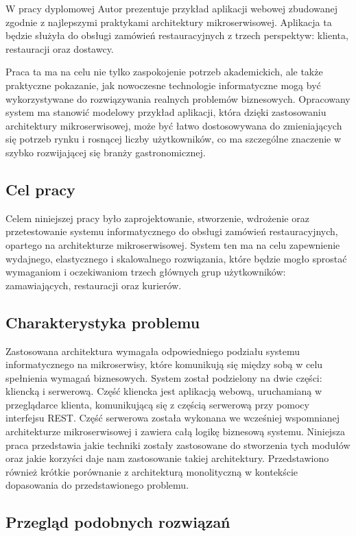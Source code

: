 W pracy dyplomowej Autor prezentuje przykład aplikacji webowej zbudowanej zgodnie z najlepszymi praktykami architektury mikroserwisowej. Aplikacja ta będzie służyła do obsługi zamówień restauracyjnych z trzech perspektyw: klienta, restauracji oraz dostawcy.

Praca ta ma na celu nie tylko zaspokojenie potrzeb akademickich, ale także praktyczne pokazanie, jak nowoczesne technologie informatyczne mogą być wykorzystywane do rozwiązywania realnych problemów biznesowych. Opracowany system ma stanowić modelowy przykład aplikacji, która dzięki zastosowaniu architektury mikroserwisowej, może być łatwo dostosowywana do zmieniających się potrzeb rynku i rosnącej liczby użytkowników, co ma szczególne znaczenie w szybko rozwijającej się branży gastronomicznej.

\subsection{Cel pracy}

Celem niniejszej pracy było zaprojektowanie, stworzenie, wdrożenie oraz przetestowanie systemu informatycznego do obsługi zamówień restauracyjnych, opartego na architekturze mikroserwisowej. System ten ma na celu zapewnienie wydajnego, elastycznego i skalowalnego rozwiązania, które będzie mogło sprostać wymaganiom i oczekiwaniom trzech głównych grup użytkowników: zamawiających, restauracji oraz kurierów.

\subsection{Charakterystyka problemu}

Zastosowana architektura wymagała odpowiedniego podziału systemu informatycznego na mikroserwisy, które komunikują się między sobą w celu spełnienia wymagań biznesowych. System został podzielony na dwie części: kliencką i serwerową. Część kliencka jest aplikacją webową, uruchamianą w przeglądarce klienta, komunikującą się z częścią serwerową przy pomocy interfejsu REST. Część serwerowa została wykonana we wcześniej wspomnianej architekturze mikroserwisowej i zawiera całą logikę biznesową systemu. Niniejsza praca przedstawia jakie techniki zostały zastosowane do stworzenia tych modułów oraz jakie korzyści daje nam zastosowanie takiej architektury. Przedstawiono również krótkie porównanie z architekturą monolityczną w kontekście dopasowania do przedstawionego problemu.

\subsection{Przegląd podobnych rozwiązań}

